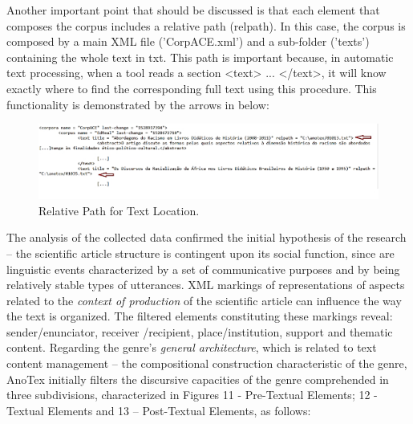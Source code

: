 \documentclass[english]{textolivre}
\begin{document}
Another important point that should be discussed is that each element that composes the corpus includes a relative path (relpath). In this case, the corpus is composed by a main XML file ('CorpACE.xml') and a sub-folder ('texts') containing the whole text in txt. This path is important because, in automatic text processing, when a tool reads a section <text> ... </text>, it will know exactly where to find the corresponding full text using this procedure. This functionality is demonstrated by the arrows in  below:

\begin{figure}[htbp]
 \centering
 \includegraphics[width=\textwidth]{Fig13.png}
 \caption{Relative Path for Text Location.}
 \label{fig-13}
\end{figure}

The analysis of the collected data confirmed the initial hypothesis of the research – the scientific article structure is contingent upon its social function, since are linguistic events characterized by a set of communicative purposes and by being relatively stable types of utterances. XML markings of representations of aspects related to the \textit{context of production} of the scientific article can influence the way the text is organized. The filtered elements constituting these markings reveal: sender/enunciator, receiver /recipient, place/institution, support and thematic content. Regarding the genre’s \textit{general architecture}, which is related to text content management – the compositional construction characteristic of the genre, AnoTex initially filters the discursive capacities of the genre comprehended in three subdivisions, characterized in Figures 11 - Pre-Textual Elements; 12 - Textual Elements and 13 – Post-Textual Elements, as follows:
\end{document}
